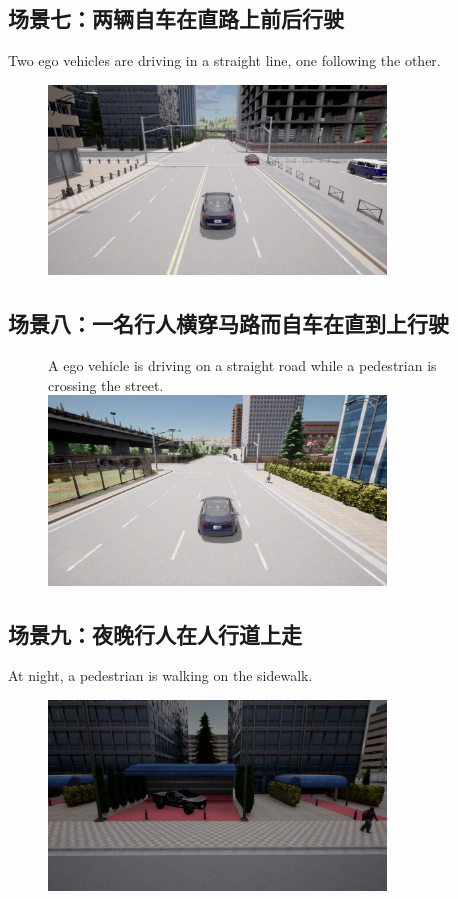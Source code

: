 \subsection {场景七：两辆自车在直路上前后行驶}
\indent Two ego vehicles are driving in a straight line, one following the other.\\
\begin{figure}[H]
	\centering
	\includegraphics[width=0.8\textwidth]{"images/场景7.pdf"}
	\caption{}
	\label{}
\end{figure}
\subsection {场景八：一名行人横穿马路而自车在直到上行驶}
\begin{figure}[H]
	\indent A ego vehicle is driving on a straight road while a pedestrian is crossing the street.\\
	\centering
	\includegraphics[width=0.8\textwidth]{"images/场景10.pdf"}
	\caption{}
	\label{}
\end{figure}
\subsection {场景九：夜晚行人在人行道上走}
\indent At night, a pedestrian is walking on the sidewalk.\\
\begin{figure}[H]
	\centering
	\includegraphics[width=0.8\textwidth]{"images/场景9.pdf"}
	\caption{}
	\label{}
\end{figure}
